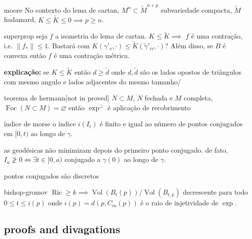 \begin{thing6}{moore}\leavevmode
No contexto do lema de cartan, \(M^n \subset \tilde{M}^{n+p}\) subvariedade compacta, \(\tilde{M}\) hadamard, \(K \leq  \tilde{K} \leq 0 \implies p \geq n\).
\end{thing6}

\begin{thing6}{superprop}\leavevmode
seja \(f\) a isometria do lema de cartan. \(K \leq  \tilde{K} \implies \) \(f\) é uma contração, i.e. \(\|f_*\|\leq  1\). Bastará com \(K(\gamma'_v,\cdot)\leq \tilde{K}(\tilde{\gamma}'_{iv},\cdot)\)? Além disso, se \(B\) é convexa então \(f\) é uma contração métrica.
\end{thing6}

\textbf{explicação:} se \(K \leq  \tilde{K}\) então \(d \geq \tilde{d}\) onde \(d,\tilde{d}\) são os lados opostos de triângulos com mesmo angulo e lados adjacentes do mesmo tamanho/

\begin{thing6}{teorema de hermann}[not in proved]\leavevmode
\(N \subset M\), \(N\) fechada e \(M\) completa, \(\operatorname{Foc}(N \subset M)=\varnothing\) então \(\operatorname{exp}^\perp\) é aplicação de recobrimento
\end{thing6}

\begin{thing6}{índice de morse}\leavevmode
o índice \(i(I_t)\) é finito e igual ao número de pontos conjugados em \([0,t)\) ao longo de \(\gamma\).
\end{thing6}

\begin{coro}\leavevmode
as geodésicas não minimizam depois do primeiro ponto conjugado. de fato, \(I_a \not\geq 0\iff\exists t\in[0,a)\) conjugado a \(\gamma(0)\) ao longo de \(\gamma\).
\end{coro}

\begin{coro}\leavevmode
pontos conjugados são discretos
\end{coro}

\begin{thing6}{bishop-gromov}\leavevmode
\(\operatorname{Ric}\geq k \implies \operatorname{Vol}(B_t(p))/\operatorname{Vol}(B_{t,k})\) decrescente para todo \(0 \leq  t \leq  i(p)\) onde \(i(p) =d(p,C_m(p))\) é o raio de injetividade de \(\operatorname{exp}\).
\end{thing6}

\subsection{proofs and divagations}

